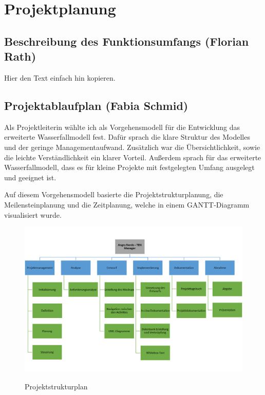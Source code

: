 \section{Projektplanung}
\label{instal}

\subsection{Beschreibung des Funktionsumfangs (Florian Rath)}

Hier den Text einfach hin kopieren.

\subsection{Projektablaufplan (Fabia Schmid)}

Als Projektleiterin wählte ich als Vorgehensmodell für die Entwicklung das erweiterte Wasserfallmodell fest. Dafür sprach die klare Struktur des Modelles und der geringe Managementaufwand. Zusätzlich war die Übersichtlichkeit, sowie die leichte Verständlichkeit ein klarer Vorteil. Außerdem sprach für das erweiterte Wasserfallmodell, dass es für kleine Projekte mit festgelegten Umfang ausgelegt und geeignet ist.

Auf diesem Vorgehensmodell basierte die Projektstrukturplanung, die Meilensteinplanung und die Zeitplanung, welche in einem GANTT-Diagramm visualisiert wurde.

\begin{figure}[H]
\centering
\begin{minipage}[t]{1\textwidth} %
\caption{Projektstrukturplan} %
\includegraphics[width=1\textwidth]{img/Projektstrukturplan}\\ %
\end{minipage}
\end{figure}

